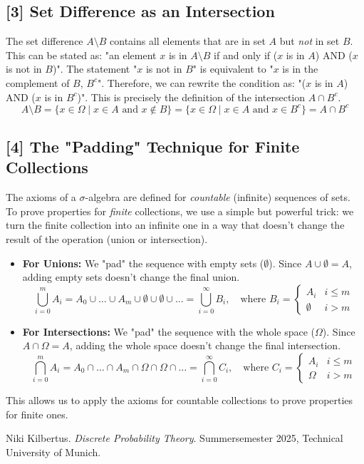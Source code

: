 \documentclass[11pt,a4paper]{article}
\theoremstyle{definition}
\begin{document}
\subsection*{[3] Set Difference as an Intersection}
\label{note:set_difference}
The set difference $A \setminus B$ contains all elements that are in set $A$ but \textit{not} in set $B$. This can be stated as: "an element $x$ is in $A \setminus B$ if and only if ($x$ is in $A$) AND ($x$ is not in $B$)". The statement "$x$ is not in $B$" is equivalent to "$x$ is in the complement of $B$, $B^c$".
Therefore, we can rewrite the condition as: "($x$ is in $A$) AND ($x$ is in $B^c$)". This is precisely the definition of the intersection $A \cap B^c$.
\[ A \setminus B = \{ x \in \Omega \mid x \in A \text{ and } x \notin B \} = \{ x \in \Omega \mid x \in A \text{ and } x \in B^c \} = A \cap B^c \]

\subsection*{[4] The "Padding" Technique for Finite Collections}
\label{note:padding}
The axioms of a $\sigma$-algebra are defined for \textit{countable} (infinite) sequences of sets. To prove properties for \textit{finite} collections, we use a simple but powerful trick: we turn the finite collection into an infinite one in a way that doesn't change the result of the operation (union or intersection).
\begin{itemize}
    \item \textbf{For Unions:} We "pad" the sequence with empty sets ($\emptyset$). Since $A \cup \emptyset = A$, adding empty sets doesn't change the final union.
    \[ \bigcup_{i=0}^{m} A_i = A_0 \cup \dots \cup A_m \cup \emptyset \cup \emptyset \cup \dots = \bigcup_{i=0}^{\infty} B_i, \quad \text{where } B_i = \begin{cases} A_i & i \le m \\ \emptyset & i > m \end{cases} \]
    \item \textbf{For Intersections:} We "pad" the sequence with the whole space ($\Omega$). Since $A \cap \Omega = A$, adding the whole space doesn't change the final intersection.
    \[ \bigcap_{i=0}^{m} A_i = A_0 \cap \dots \cap A_m \cap \Omega \cap \Omega \cap \dots = \bigcap_{i=0}^{\infty} C_i, \quad \text{where } C_i = \begin{cases} A_i & i \le m \\ \Omega & i > m \end{cases} \]
\end{itemize}
This allows us to apply the axioms for countable collections to prove properties for finite ones.


\begin{thebibliography}{9}
    Niki Kilbertus.
    \textit{Discrete Probability Theory}.
    Summersemester 2025, Technical University of Munich.
\end{thebibliography}
\end{document}
